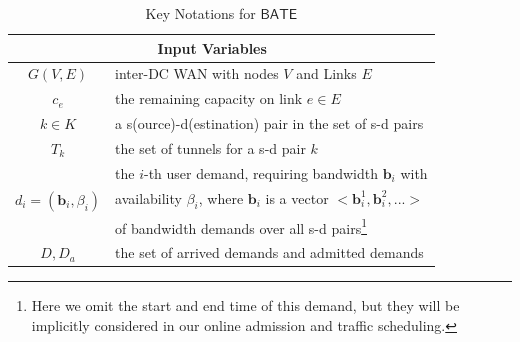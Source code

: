 \documentclass[sigconf]{acmart}
\begin{document}
\begin{table}[h!]
\small
\centering
\caption{Key Notations for $\mathsf{BATE}$}\label{Notation}
\renewcommand{\arraystretch}{1.0}
\begin{tabular}{ccccccc}  \toprule \toprule 
\setlength{\tabcolsep}{5pt}
&\textbf{Input Variables}\\
\hline
$G(V,E)$ &\multicolumn{6}{|l}{inter-DC WAN with nodes $V$ and Links $E$}\\
\hline
$c_e$ &\multicolumn{6}{|l}{the remaining capacity on link $e \in E$}\\
\hline
$k\in K$ &\multicolumn{6}{|l}{a s(ource)-d(estination) pair in the set of s-d pairs}\\
\hline
$T_{k}$ &\multicolumn{6}{|l}{the set of tunnels for a s-d pair $k$}\\
\hline
\multirow{3}{*}{$d_i=(\mathbf{b}_i, \beta_i)$}&\multicolumn{6}{|l}{the $i$-th user demand, requiring bandwidth $\mathbf{b}_i$ with }\\
&\multicolumn{6}{|l}{ availability $\beta_i$, where $\mathbf{b}_i$ is a vector $<\mathbf{b}_i^1, \mathbf{b}_i^2, ...>$}\\
&\multicolumn{6}{|l}{of bandwidth demands over all s-d pairs\footnote{Here we omit the start and end time of this demand, but they will be implicitly considered in our online admission and traffic scheduling.}} \\
\hline
$D, D_a$ &\multicolumn{6}{|l}{the set of arrived demands and admitted demands}\\

\end{tabular}
\end{table}
\end{document}
